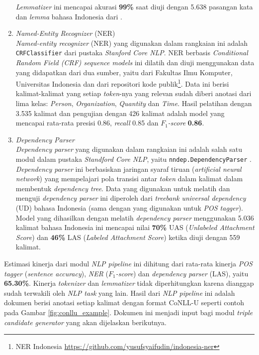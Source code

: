 \begin{enumerate}
\textit{Lemmatizer} ini mencapai akurasi \textbf{99\%} saat diuji dengan 5.638 pasangan kata dan \textit{lemma} bahasa Indonesia dari \cite{suhartono2014lemmatization}.

\item \textit{Named-Entity Recognizer} (NER) \\
\textit{Named-entity recognizer} (NER) yang digunakan dalam rangkaian ini adalah \verb|CRFClassifier| \citep{finkel2005incorporating} dari pustaka \textit{Stanford Core NLP}. NER berbasis \textit{Conditional Random Field (CRF) sequence models} ini dilatih dan diuji menggunakan data yang didapatkan dari dua sumber, yaitu dari Fakultas Ilmu Komputer, Universitas Indonesia dan dari repositori kode publik\footnote{NER Indonesia \url{https://github.com/yusufsyaifudin/indonesia-ner}}. Data ini berisi kalimat-kalimat yang setiap \textit{token}-nya yang relevan sudah diberi anotasi dari lima kelas: \textit{Person}, \textit{Organization}, \textit{Quantity} dan \textit{Time}. Hasil pelatihan dengan 3.535 kalimat dan pengujian dengan 426 kalimat adalah model yang mencapai rata-rata presisi 0.86, \textit{recall} 0.85 dan \textit{$F_1$-score} \textbf{0.86}.

\item \textit{Dependency Parser} \\
\textit{Dependency parser} yang digunakan dalam rangkaian ini adalah salah satu modul dalam pustaka \textit{Standford Core NLP}, yaitu \verb|nndep.DependencyParser| \citep{chen2014fast}. \textit{Dependency parser} ini berbasiskan jaringan syaraf tiruan (\textit{artificial neural network}) yang mempelajari pola transisi antar \textit{token} dalam kalimat dalam membentuk \textit{dependency tree}. Data yang digunakan untuk melatih dan menguji \textit{dependency parser} ini diperoleh dari \textit{treebank} \textit{universal dependency} (UD) bahasa Indonesia (sama dengan yang digunakan untuk \textit{POS tagger}). Model yang dihasilkan dengan melatih \textit{dependency parser} menggunakan 5.036 kalimat bahasa Indonesia ini mencapai nilai \textbf{70\%} UAS (\textit{Unlabeled Attachment Score}) dan \textbf{46\%} LAS (\textit{Labeled Attachment Score}) ketika diuji dengan 559 kalimat.

\end{enumerate}

Estimasi kinerja dari modul \textit{NLP pipeline} ini dihitung dari rata-rata kinerja \textit{POS tagger} (\textit{sentence accuracy}), \textit{NER} (\textit{$F_1$-score}) dan \textit{dependency parser} (LAS), yaitu \textbf{65.30\%}. Kinerja \textit{tokenizer} dan \textit{lemmatizer} tidak diperhitungkan karena dianggap sudah terwakili oleh \textit{NLP task} yang lain. Hasil dari \textit{NLP pipeline} ini adalah dokumen berisi anotasi setiap kalimat dengan format CoNLL-U seperti contoh pada Gambar \ref{fig:conllu_example}. Dokumen ini menjadi input bagi modul \textit{triple candidate generator} yang akan dijelaskan berikutnya. 

